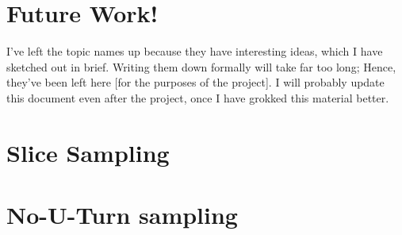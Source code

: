 \documentclass[titlepage]{article}
\begin{document}
\section{Future Work!}
I've left the topic names up because they have interesting ideas, which I have
sketched out in brief. Writing them down formally will take far too long; Hence,
they've been left here [for the purposes of the project]. I will probably update
this document even after the project, once I have grokked this material better.
\section{Slice Sampling}
\section{No-U-Turn sampling}
\end{document}
